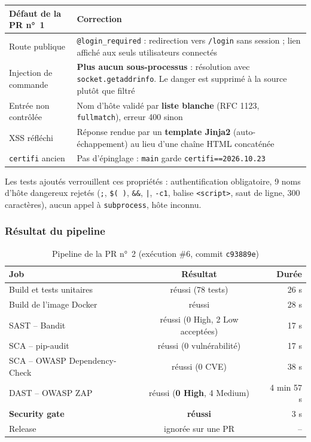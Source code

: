 \documentclass[11pt,a4paper]{article}
\newcommand{\code}[1]{\texttt{#1}}
\begin{document}
\begin{table}[H]
\centering
\small
\begin{tabularx}{\textwidth}{@{}LL@{}}
\toprule
\textbf{Défaut de la PR n°~1} & \textbf{Correction} \\
\midrule
Route publique & \code{@login\_required} : redirection vers \code{/login} sans session ; lien affiché aux seuls utilisateurs connectés \\
Injection de commande & \textbf{Plus aucun sous-processus} : résolution avec \code{socket.getaddrinfo}. Le danger est supprimé à la source plutôt que filtré \\
Entrée non contrôlée & Nom d'hôte validé par \textbf{liste blanche} (RFC 1123, \code{fullmatch}), erreur 400 sinon \\
XSS réfléchi & Réponse rendue par un \textbf{template Jinja2} (auto-échappement) au lieu d'une chaîne HTML concaténée \\
\code{certifi} ancien & Pas d'épinglage : \code{main} garde \code{certifi==2026.10.23} \\
\bottomrule
\end{tabularx}
\end{table}

Les tests ajoutés verrouillent ces propriétés : authentification obligatoire, 9 noms d'hôte dangereux
rejetés (\code{;}, \code{\$( )}, \code{\&\&}, \code{|}, \code{-c1}, balise \code{<script>}, saut de ligne,
300 caractères), aucun appel à \code{subprocess}, hôte inconnu.

\subsubsection*{Résultat du pipeline}
\begin{table}[H]
\centering
\begin{tabular}{@{}lcr@{}}
\toprule
\textbf{Job} & \textbf{Résultat} & \textbf{Durée} \\
\midrule
Build et tests unitaires & réussi (78 tests) & 26 s \\
Build de l'image Docker & réussi & 28 s \\
SAST -- Bandit & réussi (0 High, 2 Low acceptées) & 17 s \\
SCA -- pip-audit & réussi (0 vulnérabilité) & 17 s \\
SCA -- OWASP Dependency-Check & réussi (0 CVE) & 38 s \\
DAST -- OWASP ZAP & réussi (\textbf{0 High}, 4 Medium) & 4 min 57 s \\
\textbf{Security gate} & \textbf{réussi} & 3 s \\
Release & ignorée sur une PR & -- \\
\bottomrule
\end{tabular}
\caption{Pipeline de la PR n°~2 (exécution \#6, commit \code{c93889e})}
\end{table}
\end{document}
